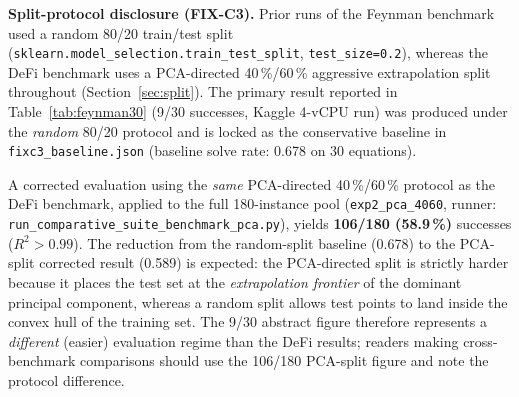 \documentclass[twoside,11pt]{article}
\newcommand{\Rsq}{R^{2}}
\begin{document}
\textbf{Split-protocol disclosure (FIX-C3).}\quad
Prior runs of the Feynman benchmark used a random 80/20 train/test split
(\texttt{sklearn.model\_selection.train\_test\_split}, \texttt{test\_size=0.2}),
whereas the DeFi benchmark uses a PCA-directed 40\,\%/60\,\% aggressive
extrapolation split throughout (Section~\ref{sec:split}).
The primary result reported in Table~\ref{tab:feynman30} (9/30 successes, Kaggle
4-vCPU run) was produced under the \emph{random} 80/20 protocol and is locked
as the conservative baseline in \texttt{fixc3\_baseline.json}
(baseline solve rate: 0.678 on 30 equations).

A corrected evaluation using the \emph{same} PCA-directed 40\,\%/60\,\% protocol
as the DeFi benchmark, applied to the full 180-instance pool
(\texttt{exp2\_pca\_4060}, runner: \texttt{run\_comparative\_suite\_benchmark\_pca.py}),
yields \textbf{106/180 (58.9\,\%)} successes ($\Rsq > 0.99$).
The reduction from the random-split baseline (0.678) to the PCA-split corrected
result (0.589) is expected: the PCA-directed split is strictly harder because it
places the test set at the \emph{extrapolation frontier} of the dominant principal
component, whereas a random split allows test points to land inside the convex hull
of the training set.
The 9/30 abstract figure therefore represents a \emph{different} (easier) evaluation
regime than the DeFi results; readers making cross-benchmark comparisons should
use the 106/180 PCA-split figure and note the protocol difference.
\end{document}
